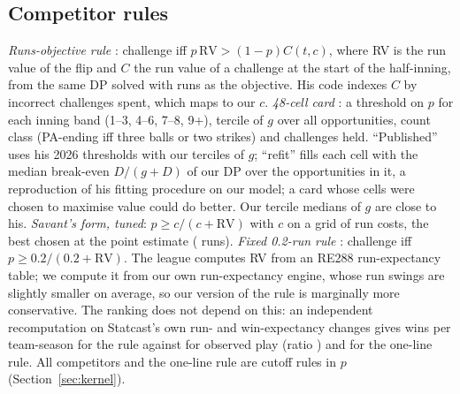 \documentclass[aoas]{imsart}
\theoremstyle{plain}
\theoremstyle{definition}
\begin{document}
\subsection{Competitor rules}
\emph{Runs-objective rule} \citep{Namuduri2026runs}: challenge iff $p\,\mathrm{RV}>(1-p)C(t,c)$, where RV is the run
value of the flip and $C$ the run value of a challenge at the start of the half-inning, from the same DP solved with
runs as the objective. His code indexes $C$ by incorrect challenges spent, which maps to our $c$.
\emph{48-cell card} \citep{Arora2026use}: a threshold on $p$ for each inning band (1--3, 4--6, 7--8, 9+), tercile of
$g$ over all opportunities, count class (PA-ending iff three balls or two strikes) and challenges held. ``Published''
uses his 2026 thresholds with our terciles of $g$; ``refit'' fills each cell with the median break-even $D/(g+D)$ of our
DP over the opportunities in it, a reproduction of his fitting procedure on our model; a card whose cells were
chosen to maximise value could do better. Our tercile medians of $g$ are close to his.
\emph{Savant's form, tuned}: $p\ge c/(c+\mathrm{RV})$ with $c$ on a grid of run costs, the best chosen at the point
estimate (\SavantTunedC{} runs).
\emph{Fixed 0.2-run rule} \citep{Savant2026abs,Tango2026costbenefit}: challenge iff $p\ge0.2/(0.2+\mathrm{RV})$. The
league computes RV from an RE288 run-expectancy table; we compute it from our own run-expectancy engine, whose run
swings are slightly smaller on average, so our version of the rule is marginally more conservative. The ranking does
not depend on this: an independent recomputation on Statcast's own run- and win-expectancy changes gives
\SIndSavant{} wins per team-season for the rule against \SIndObs{} for observed play (ratio \SIndSavantRatio) and
\SIndRule{} for the one-line rule. All competitors and the one-line rule are cutoff rules in $p$
(Section~\ref{sec:kernel}).

\begin{table}[!htbp]
\caption{The earlier estimator: the comparator with the stakes cross-fitted only (decision model, beliefs and DP fitted
on all games), wins per team-season with 95\% joint-bootstrap percentile intervals ($B=\JointBootB$); top, the benchmark
and observed play; bottom, every public rule rebuilt on our model, with the share of the benchmark and of the gap it
recovers.}\label{tab:oldpolicies}
\centering\small


\medskip

\end{table}
\end{document}
